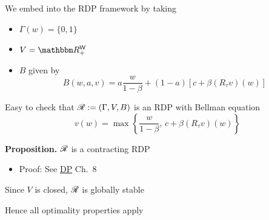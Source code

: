 \documentclass[dvipsnames]{beamer}
\begin{document}
\begin{frame}
    
    We embed into the RDP framework by taking
    \begin{itemize}
        \item $\Gamma(w) = \{0, 1\}$
        \vspace{0.5em}
        \item $V = \RR^\Wsf_+$
        \vspace{0.5em}
        \item $B$ given by 
            \begin{equation*}
                B(w, a, v) 
                = a \frac{w}{1-\beta} + (1-a) [ c + \beta (R_\tau v)(w) ]
            \end{equation*}
    \end{itemize}
    
        \vspace{0.5em}
        \vspace{0.5em}
        \vspace{0.5em}
    Easy to check that $\mathscr R := (\Gamma, V, B)$ is an RDP with Bellman equation
    \begin{equation*}
        v(w) =
        \max
        \left\{
             \frac{w}{1-\beta} , \,   c + \beta (R_\tau v)(w) 
        \right\}
    \end{equation*}


\end{frame}


\begin{frame}
    
    {\bf Proposition.}  $\mathscr R$ is a contracting RDP

        \vspace{0.5em}
    \begin{itemize}
        \item Proof: See \href{https://dp.quantecon.org}{DP} Ch.~8
    \end{itemize}

        \vspace{0.5em}
        \vspace{0.5em}
        \vspace{0.5em}
    Since $V$ is closed, $\mathscr R$ is globally stable 

        \vspace{0.5em}
    Hence all optimality properties apply

\end{frame}
\end{document}
